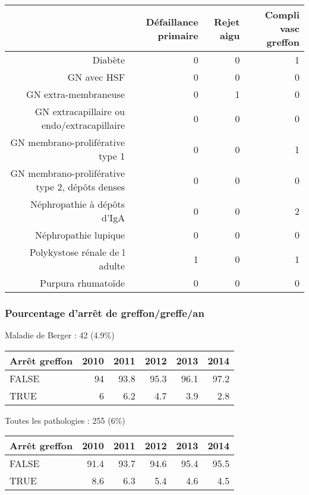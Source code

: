 \documentclass[11pt,a4paper]{article}\usepackage[]{graphicx}\usepackage[]{color}
\begin{document}
\begin{table}[H]
\centering
\begin{tabular}{rrrr}
  \hline
 & Défaillance primaire & Rejet aigu & Compli vasc greffon \\ 
  \hline
Diabète &   0 &   0 &   1 \\ 
  GN avec HSF &   0 &   0 &   0 \\ 
  GN extra-membraneuse &   0 &   1 &   0 \\ 
  GN extracapillaire ou endo/extracapillaire &   0 &   0 &   0 \\ 
  GN membrano-proliférative type 1 &   0 &   0 &   1 \\ 
  GN membrano-proliférative type 2, dépôts denses &   0 &   0 &   0 \\ 
  Néphropathie à dépôts d'IgA &   0 &   0 &   2 \\ 
  Néphropathie lupique &   0 &   0 &   0 \\ 
  Polykystose rénale de l adulte &   1 &   0 &   1 \\ 
  Purpura rhumatoïde &   0 &   0 &   0 \\ 
   \hline
\end{tabular}
\end{table}


    \subsubsection{Pourcentage d'arrêt de greffon/greffe/an}

Maladie de Berger : 42 (4.9\%)

\begin{table}[H]
\centering
\begin{tabular}{lrrrrr}
  \hline
Arrêt greffon & 2010 & 2011 & 2012 & 2013 & 2014 \\ 
  \hline
FALSE & 94 & 93.8 & 95.3 & 96.1 & 97.2 \\ 
  TRUE & 6 & 6.2 & 4.7 & 3.9 & 2.8 \\ 
   \hline
\end{tabular}
\end{table}


Toutes les pathologies : 255 (6\%)

\begin{table}[H]
\centering
\begin{tabular}{lrrrrr}
  \hline
Arrêt greffon & 2010 & 2011 & 2012 & 2013 & 2014 \\ 
  \hline
FALSE & 91.4 & 93.7 & 94.6 & 95.4 & 95.5 \\ 
  TRUE & 8.6 & 6.3 & 5.4 & 4.6 & 4.5 \\ 
   \hline
\end{tabular}
\end{table}
\end{document}
